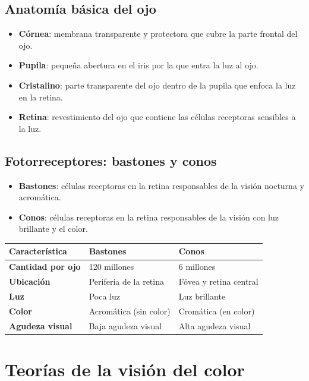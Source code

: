 \documentclass[11pt,a4paper]{article}
\begin{document}
\subsection*{Anatomía básica del ojo}
\begin{itemize}
  \item \textbf{Córnea}: membrana transparente y protectora que cubre la parte frontal del ojo.
  \item \textbf{Pupila}: pequeña abertura en el iris por la que entra la luz al ojo.
  \item \textbf{Cristalino}: parte transparente del ojo dentro de la pupila que enfoca la luz en la retina.
  \item \textbf{Retina}: revestimiento del ojo que contiene las células receptoras sensibles a la luz.
\end{itemize}

\subsection*{Fotorreceptores: bastones y conos}
\begin{itemize}
  \item \textbf{Bastones}: células receptoras en la retina responsables de la visión nocturna y acromática.
  \item \textbf{Conos}: células receptoras en la retina responsables de la visión con luz brillante y el color.
\end{itemize}

\begin{center}
\begin{tabular}{@{} >{\bfseries}l l l @{}}
\toprule
\rowcolor{Primary}
\color{white}Característica & \color{white}\textbf{Bastones} & \color{white}\textbf{Conos} \\
\midrule
Cantidad por ojo & 120 millones & 6 millones \\
Ubicación & Periferia de la retina & Fóvea y retina central \\
Luz & Poca luz & Luz brillante \\
Color & Acromática (sin color) & Cromática (en color) \\
Agudeza visual & Baja agudeza visual & Alta agudeza visual \\
\bottomrule
\end{tabular}
\end{center}

\section{Teorías de la visión del color}
\end{document}
